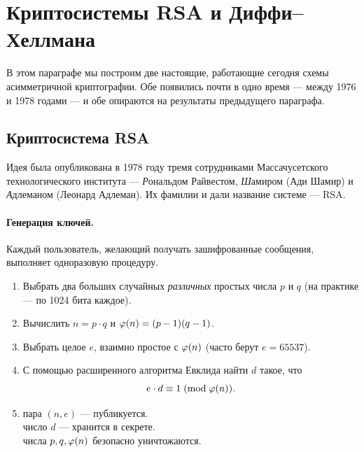 
\section{Криптосистемы RSA и Диффи--Хеллмана}
\label{sec:rsa-dh}

В этом параграфе мы построим две настоящие, работающие сегодня схемы асимметричной криптографии. Обе появились почти в одно время --- между 1976 и 1978 годами --- и обе опираются на результаты предыдущего параграфа.

\subsection{Криптосистема RSA}

Идея была опубликована в 1978 году тремя сотрудниками Массачусетского технологического института --- \emph{Р}ональдом Райвестом, \emph{Ш}амиром (Ади Шамир) и \emph{А}длеманом (Леонард Адлеман). Их фамилии и дали название системе --- RSA.

\paragraph*{Генерация ключей.} Каждый пользователь, желающий получать зашифрованные сообщения, выполняет одноразовую процедуру.

\begin{algorithmbox}[title={Алгоритм: генерация ключей RSA}]
\begin{enumerate}
  \item Выбрать два больших случайных \emph{различных} простых числа $p$ и $q$ (на практике --- по 1024 бита каждое).
  \item Вычислить $n = p\cdot q$ и $\varphi(n) = (p-1)(q-1)$.
  \item Выбрать целое $e$, взаимно простое с $\varphi(n)$ (часто берут $e = 65537$).
  \item С помощью расширенного алгоритма Евклида найти $d$ такое, что
  \[
  e\cdot d \equiv 1 \;(\mathrm{mod}\;\varphi(n)).
  \]
  \item {} пара $(n, e)$ --- публикуется.\\
         число $d$ --- хранится в секрете.\\
         числа $p, q, \varphi(n)$ безопасно уничтожаются.
\end{enumerate}
\end{algorithmbox}

